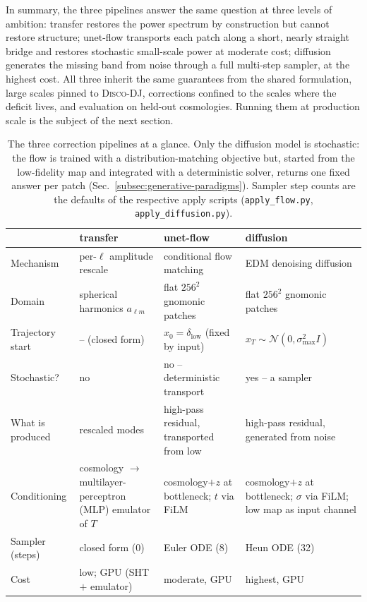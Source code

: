 \documentclass{report}
\begin{document}
In summary, the three pipelines answer the same question at three levels of ambition: transfer restores the power spectrum by construction but cannot restore structure; unet-flow transports each patch along a short, nearly straight bridge and restores stochastic small-scale power at moderate cost; diffusion generates the missing band from noise through a full multi-step sampler, at the highest cost. All three inherit the same guarantees from the shared formulation, large scales pinned to \textsc{Disco-DJ}, corrections confined to the scales where the deficit lives, and evaluation on held-out cosmologies. Running them at production scale is the subject of the next section.

\begin{table}[h!]
\centering
\small
\begin{tabular}{@{}lp{3.6cm}p{3.6cm}p{3.6cm}@{}}
\toprule
 & \textcolor{ctrans}{\textbf{transfer}} & \textcolor{cunet}{\textbf{unet-flow}} & \textcolor{cdiff}{\textbf{diffusion}} \\
\midrule
Mechanism        & per-$\ell$ amplitude rescale & conditional flow matching & EDM denoising diffusion \\
Domain           & spherical harmonics $a_{\ell m}$ & flat $256^2$ gnomonic patches & flat $256^2$ gnomonic patches \\
Trajectory start & -- (closed form) & $x_0 = \delta_{\mathrm{low}}$ (fixed by input) & $x_T \sim \mathcal{N}(0, \sigma_{\max}^2 I)$ \\
Stochastic?      & no & no -- deterministic transport & yes -- a sampler \\
What is produced & rescaled modes & high-pass residual, transported from low & high-pass residual, generated from noise \\
Conditioning     & cosmology $\to$ multilayer-perceptron (MLP) emulator of $T$ & cosmology$+z$ at bottleneck; $t$ via FiLM & cosmology$+z$ at bottleneck; $\sigma$ via FiLM; low map as input channel \\
Sampler (steps)  & closed form (0) & Euler ODE (8) & Heun ODE (32) \\
Cost             & low; GPU (SHT $+$ emulator) & moderate, GPU & highest, GPU \\
\bottomrule
\end{tabular}
\caption{The three correction pipelines at a glance. Only the diffusion model is stochastic: the flow is trained with a distribution-matching objective but, started from the low-fidelity map and integrated with a deterministic solver, returns one fixed answer per patch (Sec.~\ref{subsec:generative-paradigms}). Sampler step counts are the defaults of the respective apply scripts (\texttt{apply\_flow.py}, \texttt{apply\_diffusion.py}).}
\label{tab:pipelines}
\end{table}
\end{document}
